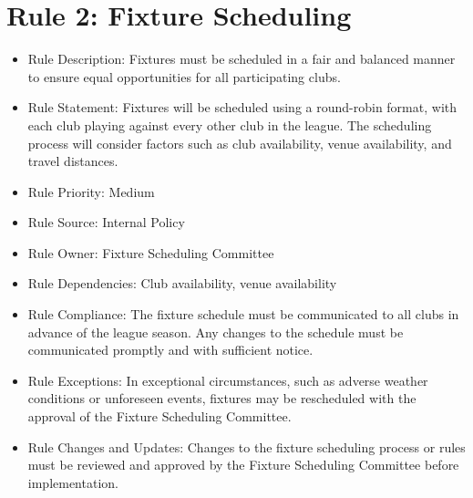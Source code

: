 \documentclass[12pt]{article}
\begin{document}
\section{ Rule 2: Fixture Scheduling}
\begin{itemize}
    \item Rule Description: Fixtures must be scheduled in a fair and balanced manner to ensure equal opportunities for all participating clubs.
    \item Rule Statement: Fixtures will be scheduled using a round-robin format, with each club playing against every other club in the league. The scheduling process will consider factors such as club availability, venue availability, and travel distances.
    \item Rule Priority: Medium
    \item Rule Source: Internal Policy
    \item Rule Owner: Fixture Scheduling Committee
    \item Rule Dependencies: Club availability, venue availability
    \item Rule Compliance: The fixture schedule must be communicated to all clubs in advance of the league season. Any changes to the schedule must be communicated promptly and with sufficient notice.
    \item Rule Exceptions: In exceptional circumstances, such as adverse weather conditions or unforeseen events, fixtures may be rescheduled with the approval of the Fixture Scheduling Committee.
    \item Rule Changes and Updates: Changes to the fixture scheduling process or rules must be reviewed and approved by the Fixture Scheduling Committee before implementation.
\end{itemize}
\end{document}
